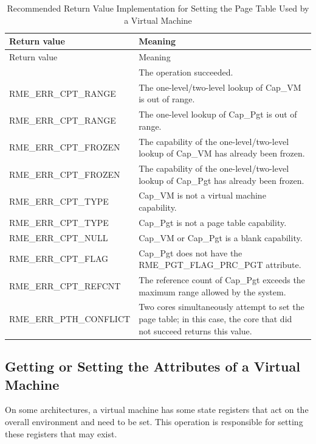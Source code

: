 \begin{xltabular}{\textwidth}{@{}>{\hsize\raggedright\arraybackslash}X>{\hsize\raggedright\arraybackslash}X@{}}
\caption{Recommended Return Value Implementation for Setting the Page Table Used by a Virtual Machine}\label{tab:8-78-set-virtual-machine-page-table-suggested-return-values}\\
\toprule
Return value & Meaning\tabularnewline
\endfirsthead
\toprule
Return value & Meaning\tabularnewline
\midrule
\endhead
\bottomrule
{} & The operation succeeded.\tabularnewline
    RME\_ERR\_CPT\_RANGE & The one-level/two-level lookup of Cap\_VM is out of range.\tabularnewline
    RME\_ERR\_CPT\_RANGE & The one-level lookup of Cap\_Pgt is out of range.\tabularnewline
    RME\_ERR\_CPT\_FROZEN & The capability of the one-level/two-level lookup of Cap\_VM has already been frozen.\tabularnewline
    RME\_ERR\_CPT\_FROZEN & The capability of the one-level/two-level lookup of Cap\_Pgt has already been frozen.\tabularnewline
    RME\_ERR\_CPT\_TYPE & Cap\_VM is not a virtual machine capability.\tabularnewline
    RME\_ERR\_CPT\_TYPE & Cap\_Pgt is not a page table capability.\tabularnewline
    RME\_ERR\_CPT\_NULL & Cap\_VM or Cap\_Pgt is a blank capability.\tabularnewline
    RME\_ERR\_CPT\_FLAG & Cap\_Pgt does not have the RME\_PGT\_FLAG\_PRC\_PGT attribute.\tabularnewline
    RME\_ERR\_CPT\_REFCNT & The reference count of Cap\_Pgt exceeds the maximum range allowed by the system.\tabularnewline
    RME\_ERR\_PTH\_CONFLICT & Two cores simultaneously attempt to set the page table; in this case, the core that did not succeed returns this value.\tabularnewline
\end{xltabular}
\nopagebreak[4]

\subsection{Getting or Setting the Attributes of a Virtual Machine}\label{subsec:8-get-or-set-virtual-machine-attributes}

On some architectures, a virtual machine has some state registers that act on the overall environment and need to be set. This operation is responsible for setting these registers that may exist.

